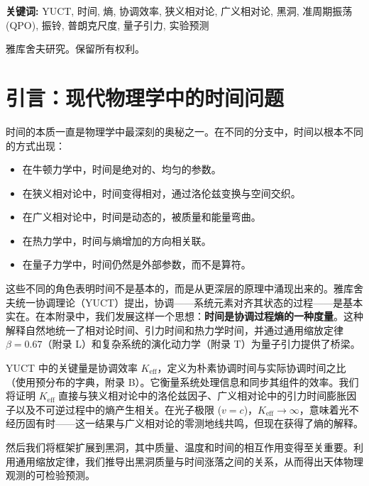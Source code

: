 \documentclass[12pt,a4paper]{article}
\newcommand{\Keff}{K_{\mathrm{eff}}}
\begin{document}
\begin{titlepage}
\begin{center}
			\vspace{1cm}
			
			\noindent
			\small\textbf{关键词:} YUCT, 时间, 熵, 协调效率, 狭义相对论, 广义相对论, 黑洞, 准周期振荡(QPO), 振铃, 普朗克尺度, 量子引力, 实验预测
			
			\vspace{0.5cm}
			
			\noindent
			 雅库舍夫研究。保留所有权利。
		\end{center}
	\end{titlepage}
	
	\tableofcontents
	\newpage
	
	\section{引言：现代物理学中的时间问题}
	\label{sec:intro}
	
	时间的本质一直是物理学中最深刻的奥秘之一。在不同的分支中，时间以根本不同的方式出现：
	\begin{itemize}
		\item 在牛顿力学中，时间是绝对的、均匀的参数。
		\item 在狭义相对论中，时间变得相对，通过洛伦兹变换与空间交织。
		\item 在广义相对论中，时间是动态的，被质量和能量弯曲。
		\item 在热力学中，时间与熵增加的方向相关联。
		\item 在量子力学中，时间仍然是外部参数，而不是算符。
	\end{itemize}
	
	这些不同的角色表明时间不是基本的，而是从更深层的原理中涌现出来的。雅库舍夫统一协调理论（YUCT）提出，协调——系统元素对齐其状态的过程——是基本实在。在本附录中，我们发展这样一个思想：\textbf{时间是协调过程熵的一种度量}。这种解释自然地统一了相对论时间、引力时间和热力学时间，并通过通用缩放定律 \(\beta = 0.67\)（附录 L）和复杂系统的演化动力学（附录 T）为量子引力提供了桥梁。
	
	YUCT 中的关键量是协调效率 \(\Keff\)，定义为朴素协调时间与实际协调时间之比（使用预分布的字典，附录 B）。它衡量系统处理信息和同步其组件的效率。我们将证明 \(\Keff\) 直接与狭义相对论中的洛伦兹因子、广义相对论中的引力时间膨胀因子以及不可逆过程中的熵产生相关。在光子极限 (\(v=c\))，\(\Keff \to \infty\)，意味着光不经历固有时——这一结果与广义相对论的零测地线共鸣，但现在获得了熵的解释。
	
	然后我们将框架扩展到黑洞，其中质量、温度和时间的相互作用变得至关重要。利用通用缩放定律，我们推导出黑洞质量与时间涨落之间的关系，从而得出天体物理观测的可检验预测。
	
\end{document}
